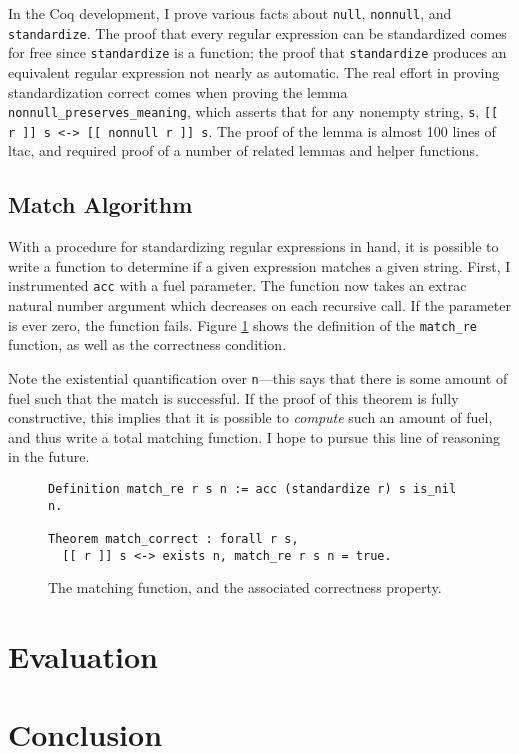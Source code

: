 \documentclass{article}
\newcommand{\coq}[1]{\texttt{#1}}
\begin{document}
In the Coq development, I prove various facts about \coq{null}, \coq{nonnull},
and \coq{standardize}. The proof that every regular expression can be
standardized comes for free since \coq{standardize} is a function; the proof
that \coq{standardize} produces an equivalent regular expression not nearly as
automatic. The real effort in proving standardization correct comes when proving
the lemma \coq{nonnull_preserves_meaning}, which asserts that for any nonempty
string, \coq{s}, \coq{[[ r ]] s <-> [[ nonnull r ]] s}. The proof of the lemma
is almost 100 lines of ltac, and required proof of a number of related lemmas
and helper functions.

\subsection{Match Algorithm}
With a procedure for standardizing regular expressions in hand, it is possible
to write a function to determine if a given expression matches a given string.
First, I instrumented \coq{acc} with a fuel parameter. The function now takes an
extrac natural number argument which decreases on each recursive call. If the
parameter is ever zero, the function fails. Figure \ref{fig:match} shows the
definition of the \coq{match_re} function, as well as the correctness condition.

Note the existential quantification over \coq{n}---this says that there is some
amount of fuel such that the match is successful. If the proof of this theorem
is fully constructive, this implies that it is possible to \emph{compute} such
an amount of fuel, and thus write a total matching function. I hope to pursue
this line of reasoning in the future.


\begin{figure}
  \centering
\begin{verbatim}
Definition match_re r s n := acc (standardize r) s is_nil n.

Theorem match_correct : forall r s,
  [[ r ]] s <-> exists n, match_re r s n = true.
\end{verbatim}
\caption{The matching function, and the associated correctness property.}
\label{fig:match}
\end{figure}

\section{Evaluation} \label{eval}

\section{Conclusion} \label{conclusion}

{}

\end{document}
